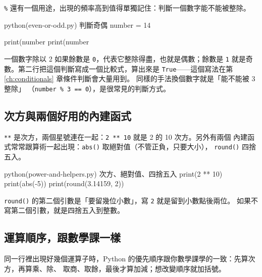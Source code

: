 
\texttt{\%} 還有一個用途，出現的頻率高到值得單獨記住：判斷一個數字能不能被整除。

\begin{example}{python}{(even-or-odd.py) 判斷奇偶}
number = 14

print(number %
print(number %
\end{example}


一個數字除以 2 如果餘數是 \texttt{0}，代表它整除得盡，也就是偶數；餘數是 \texttt{1}
就是奇數。第二行把這個判斷寫成一個比較式，算出來是 \texttt{True}——這個寫法在第
\ref{ch:conditionals} 章條件判斷會大量用到。 同樣的手法換個數字就是「能不能被 3 整除」
（\texttt{number \% 3 == 0}），是很常見的判斷方式。

\subsection*{次方與兩個好用的內建函式}

\texttt{**} 是次方，兩個星號連在一起：\texttt{2 ** 10} 就是 2 的 10 次方。另外有兩個
內建函式常常跟算術一起出現：\texttt{abs()} 取絕對值（不管正負，只要大小），
\texttt{round()} 四捨五入。

\begin{example}{python}{(power-and-helpers.py) 次方、絕對值、四捨五入}
print(2 ** 10)
print(abs(-5))
print(round(3.14159, 2))
\end{example}


\texttt{round()} 的第二個引數是「要留幾位小數」，寫 \texttt{2} 就是留到小數點後兩位。
如果不寫第二個引數，就是四捨五入到整數。

\subsection*{運算順序，跟數學課一樣}

同一行裡出現好幾個運算子時，Python 的優先順序跟你數學課學的一致：先算次方，再算乘、除、
取商、取餘，最後才算加減；想改變順序就加括號。

